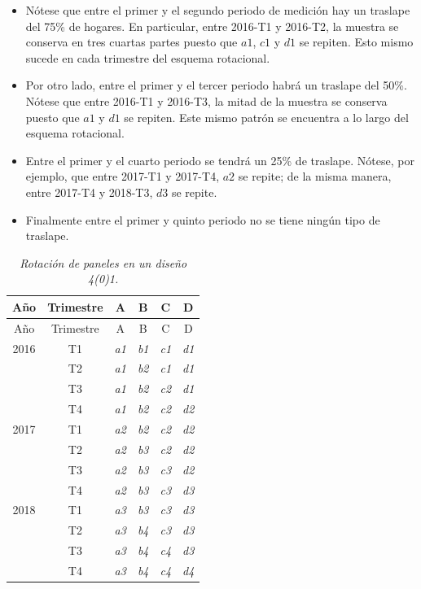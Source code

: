 \documentclass[
  12pt,
]{book}
\providecommand{\tightlist}{%
  \setlength{\itemsep}{0pt}\setlength{\parskip}{0pt}}
\begin{document}
\begin{itemize}
\tightlist
\item
  Nótese que entre el primer y el segundo periodo de medición hay un traslape del 75\% de hogares. En particular, entre 2016-T1 y 2016-T2, la muestra se conserva en tres cuartas partes puesto que \(a1\), \(c1\) y \(d1\) se repiten. Esto mismo sucede en cada trimestre del esquema rotacional.
\item
  Por otro lado, entre el primer y el tercer periodo habrá un traslape del 50\%. Nótese que entre 2016-T1 y 2016-T3, la mitad de la muestra se conserva puesto que \(a1\) y \(d1\) se repiten. Este mismo patrón se encuentra a lo largo del esquema rotacional.
\item
  Entre el primer y el cuarto periodo se tendrá un 25\% de traslape. Nótese, por ejemplo, que entre 2017-T1 y 2017-T4, \(a2\) se repite; de la misma manera, entre 2017-T4 y 2018-T3, \(d3\) se repite.
\item
  Finalmente entre el primer y quinto periodo no se tiene ningún tipo de traslape.
\end{itemize}

\begin{longtable}[]{@{}cccccc@{}}
\caption{\emph{Rotación de paneles en un diseño 4(0)1.}}\tabularnewline
\toprule()
Año & Trimestre & A & B & C & D \\
\midrule()
\endfirsthead
\toprule()
Año & Trimestre & A & B & C & D \\
\midrule()
\endhead
2016 & T1 & \emph{a1} & \emph{b1} & \emph{c1} & \emph{d1} \\
& T2 & \emph{a1} & \emph{b2} & \emph{c1} & \emph{d1} \\
& T3 & \emph{a1} & \emph{b2} & \emph{c2} & \emph{d1} \\
& T4 & \emph{a1} & \emph{b2} & \emph{c2} & \emph{d2} \\
2017 & T1 & \emph{a2} & \emph{b2} & \emph{c2} & \emph{d2} \\
& T2 & \emph{a2} & \emph{b3} & \emph{c2} & \emph{d2} \\
& T3 & \emph{a2} & \emph{b3} & \emph{c3} & \emph{d2} \\
& T4 & \emph{a2} & \emph{b3} & \emph{c3} & \emph{d3} \\
2018 & T1 & \emph{a3} & \emph{b3} & \emph{c3} & \emph{d3} \\
& T2 & \emph{a3} & \emph{b4} & \emph{c3} & \emph{d3} \\
& T3 & \emph{a3} & \emph{b4} & \emph{c4} & \emph{d3} \\
& T4 & \emph{a3} & \emph{b4} & \emph{c4} & \emph{d4} \\
\bottomrule()
\end{longtable}
\end{document}

